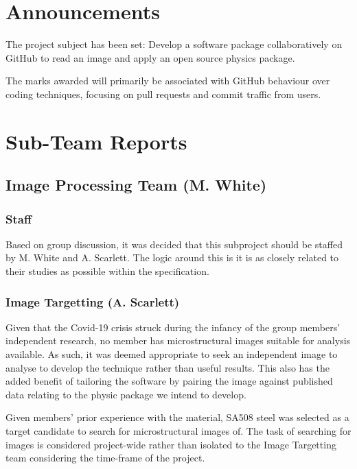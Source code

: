 \documentclass[11pt]{meetingmins}
\begin{document}
	\maketitle
	
	\section{Announcements}
	\begin{hiddenitems}
		\item
		The project subject has been set: Develop a software package collaboratively on GitHub to read an image and apply an open source physics package. 
		
		\item
		The marks awarded will primarily be associated with GitHub behaviour over coding techniques, focusing on pull requests and commit traffic from users.
		
	\end{hiddenitems}
	
	\section{Sub-Team Reports}
	
	\subsection{Image Processing Team {\rm(M. White)}}
	\subsubsection{Staff}
	Based on group discussion, it was decided that this subproject should be staffed by M. White and A. Scarlett. The logic around this is it is as closely related to their studies as possible within the specification.
	
	\subsubsection{Image Targetting {\rm (A. Scarlett)}}
	\begin{hiddensubitems}
		\item
		Given that the Covid-19 crisis struck during the infancy of the group members' independent research, no member has microstructural images suitable for analysis available. As such, it was deemed appropriate to seek an independent image to analyse to develop the technique rather than useful results. This also has the added benefit of tailoring the software by pairing the image against published data relating to the physic package we intend to develop.
		
		\item
		Given members' prior experience with the material, SA508 steel was selected as a target candidate to search for microstructural images of. The task of searching for images is considered project-wide rather than isolated to the Image Targetting team considering the time-frame of the project.
	\end{hiddensubitems}
	
\end{document}
